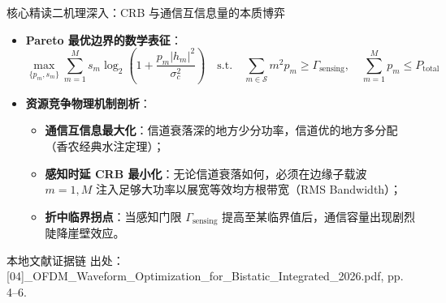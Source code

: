 \documentclass[aspectratio=169, 10pt]{ctexbeamer}
\begin{document}
\begin{frame}{核心精读二机理深入：CRB 与通信互信息量的本质博弈}
  \begin{itemize}
    \item \textbf{Pareto 最优边界的数学表征}：
    \begin{equation*}
      \max_{\{p_m, s_m\}} \sum_{m=1}^M s_m \log_2\left(1 + \frac{p_m |h_m|^2}{\sigma_c^2}\right) \quad \text{s.t.} \quad \sum_{m \in \mathcal{S}} m^2 p_m \ge \Gamma_{\mathrm{sensing}}, \quad \sum_{m=1}^M p_m \le P_{\mathrm{total}}
    \end{equation*}
    \item \textbf{资源竞争物理机制剖析}：
    \begin{itemize}
      \item \textbf{通信互信息最大化}：信道衰落深的地方少分功率，信道优的地方多分配（香农经典水注定理）；
      \item \textbf{感知时延 CRB 最小化}：无论信道衰落如何，必须在边缘子载波 $m=1, M$ 注入足够大功率以展宽等效均方根带宽（RMS Bandwidth）；
      \item \textbf{折中临界拐点}：当感知门限 $\Gamma_{\mathrm{sensing}}$ 提高至某临界值后，通信容量出现剧烈陡降崖壁效应。
    \end{itemize}
  \end{itemize}

  \begin{block}{本地文献证据链}
    \footnotesize \textcolor{evidencegray}{出处：[04]\_OFDM\_Waveform\_Optimization\_for\_Bistatic\_Integrated\_2026.pdf, pp. 4--6.}
  \end{block}
\end{frame}
\end{document}

